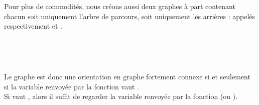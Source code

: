 \documentclass{article}      %
\begin{document}
Pour plus de commodités, nous créons aussi deux graphes à part contenant chacun soit uniquement l'arbre de parcours, soit uniquement les arrières : appelés respectivement  et .

\begin{figure}[H]
    \centering
    \\
\end{figure}

\begin{figure}[H]
    \centering
    \\
\end{figure}

Le graphe  est donc une orientation en graphe fortement connexe si et seulement si la variable  renvoyée par la fonction vaut .
\\Si {} vaut , alors il suffit de regarder la variable  renvoyée par la fonction (ou ).
\end{document}
